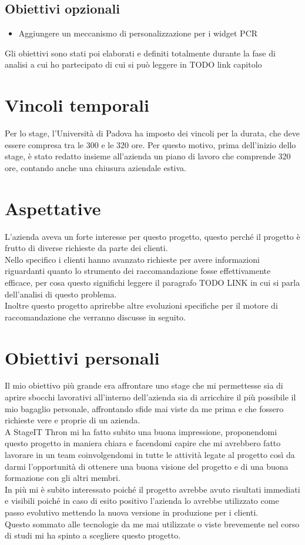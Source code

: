 \documentclass[a4paper, 12pt, twoside, openright]{book}
\begin{document}
\subsection{Obiettivi opzionali}
\begin{itemize}
\item Aggiungere un meccanismo di personalizzazione per i widget PCR
\end{itemize}

Gli obiettivi sono stati poi elaborati e definiti totalmente durante la fase di analisi a cui ho partecipato di cui si può leggere in TODO link capitolo

\section{Vincoli temporali}
Per lo stage, l'Università di Padova ha imposto dei vincoli per la durata, che deve essere compresa tra le 300 e le 320 ore. Per questo motivo, prima dell'inizio dello stage, è stato redatto insieme all'azienda un piano di lavoro che comprende 320 ore, contando anche una chiusura aziendale estiva.

\section{Aspettative}
L'azienda aveva un forte interesse per questo progetto, questo perché il progetto è frutto di diverse richieste da parte dei clienti.\\
Nello specifico i clienti hanno avanzato richieste per avere informazioni riguardanti quanto lo strumento dei raccomandazione fosse effettivamente efficace, per cosa questo significhi leggere il paragrafo TODO LINK in cui si parla dell'analisi di questo problema.\\
Inoltre questo progetto aprirebbe altre evoluzioni specifiche per il motore di raccomandazione che verranno discusse in seguito.

\section{Obiettivi personali}
Il mio obiettivo più grande era affrontare uno stage che mi permettesse sia di aprire sbocchi lavorativi all'interno dell'azienda sia di arricchire il più possibile il mio bagaglio personale, affrontando sfide mai viste da me prima e che fossero richieste vere e proprie di un azienda.\\
A StageIT Thron mi ha fatto subito una buona impressione, proponendomi questo progetto in maniera chiara e facendomi capire che mi avrebbero fatto lavorare in un team coinvolgendomi in tutte le attività legate al progetto così da darmi l'opportunità di ottenere una buona visione del progetto e di una buona formazione con gli altri membri.\\
In più mi è subito interessato poiché il progetto avrebbe avuto risultati immediati e visibili poiché in caso di esito positivo l'azienda lo avrebbe utilizzato come passo evolutivo mettendo la nuova versione in produzione per i clienti.\\
Questo sommato alle tecnologie da me mai utilizzate o viste brevemente nel corso di studi mi ha spinto a scegliere questo progetto.
\end{document}
